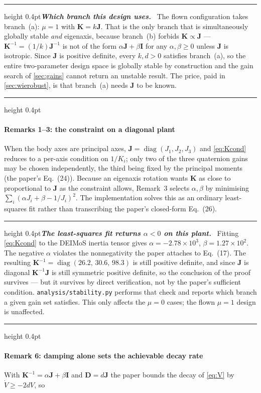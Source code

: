 \documentclass[conference,10pt,a4paper]{IEEEtran}
\newcommand{\remarkrule}{\par\nobreak\vspace{2pt}%
  \hrule height 0.4pt\vspace{4pt}\nobreak}
\newenvironment{keybox}[1][Result]
  {\par\medskip\remarkrule\noindent\small\textbf{\textit{#1.}}\ \ignorespaces}
  {\par\vspace{3pt}\hrule height 0.4pt\par\medskip\ignorespacesafterend}
\newenvironment{cautionbox}[1][Caveat]
  {\par\medskip\remarkrule\noindent\small\textbf{\textit{#1.}}\ \ignorespaces}
  {\par\vspace{3pt}\hrule height 0.4pt\par\medskip\ignorespacesafterend}
\newcommand{\mat}[1]{\bm{#1}}
\DeclareMathOperator{\diag}{diag}
\begin{document}
\begin{keybox}[Which branch this design uses]
The flown configuration takes branch~(a): $\mu=1$ with
$\mat{K}=k\mat{J}$. That is the only branch that is simultaneously globally
stable \emph{and} eigenaxis, because branch~(b) forbids
$\mat{K}\propto\mat{J}$ --- $\mat{K}^{-1}=(1/k)\mat{J}^{-1}$ is not of the form
$\alpha\mat{J}+\beta\mat{I}$ for any $\alpha,\beta\ge0$ unless $\mat{J}$ is
isotropic. Since $\mat{J}$ is positive definite, every $k,d>0$ satisfies
branch~(a), so the entire two-parameter design space is globally stable by
construction and the gain search of \cref{sec:gains} cannot return an unstable
result. The price, paid in \cref{sec:wierobust}, is that branch~(a) needs
$\mat{J}$ to be known.
\end{keybox}

\paragraph{Remarks 1--3: the constraint on a diagonal plant}
When the body axes are principal axes, $\mat{J}=\diag(J_1,J_2,J_3)$ and
\cref{eq:Kcond} reduces to a per-axis condition on $1/K_i$; only two of the
three quaternion gains may be chosen independently, the third being fixed by
the principal moments (the paper's Eq.~(24)). Because an eigenaxis rotation
wants $\mat{K}$ as close to proportional to $\mat{J}$ as the constraint allows,
Remark~3 selects $\alpha,\beta$ by minimising
$\sum_i\left(\alpha J_i+\beta-1/J_i\right)^2$. The implementation solves this
as an ordinary least-squares fit rather than transcribing the paper's
closed-form Eq.~(26).

\begin{cautionbox}[The least-squares fit returns $\alpha<0$ on this plant]
Fitting \cref{eq:Kcond} to the DEIMoS inertia tensor gives
$\alpha=-2.78\times10^{3}$, $\beta=1.27\times10^{2}$. The negative $\alpha$
violates the nonnegativity the paper attaches to Eq.~(17). The resulting
$\mat{K}^{-1}=\diag(26.2,\,30.6,\,98.3)$ is still positive definite, and since
$\mat{J}$ is diagonal $\mat{K}^{-1}\mat{J}$ is still symmetric positive
definite, so the conclusion of the proof survives --- but it survives by direct
verification, not by the paper's sufficient condition. \texttt{analysis/stability.py}
performs that check and reports which branch a given gain set satisfies. This
only affects the $\mu=0$ cases; the flown $\mu=1$ design is unaffected.
\end{cautionbox}

\paragraph{Remark 6: damping alone sets the achievable decay rate}
With $\mat{K}^{-1}=\alpha\mat{J}+\beta\mat{I}$ and $\mat{D}=d\mat{J}$ the
paper bounds the decay of \cref{eq:V} by
$\dot{V}\ge-2dV$, so
\end{document}
